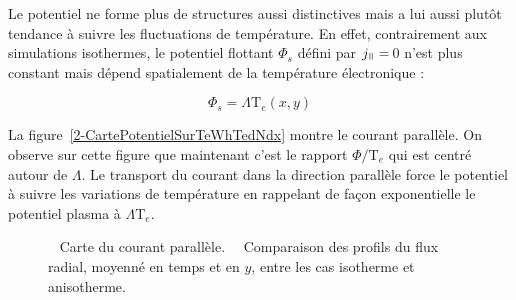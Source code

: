 \begin{refsection}
Le potentiel ne forme plus de structures aussi
distinctives mais a lui aussi
plutôt tendance à suivre les fluctuations de température. En effet,
contrairement aux simulations isothermes, le potentiel flottant $\Phi_s$ défini
par $j_\para=\,$0 n'est plus constant mais dépend spatialement de la
température électronique :

\begin{equation}
	\Phi_{s}=\Lambda\text{T}_e(x,y)
\end{equation}

La figure~\ref{2-CartePotentielSurTeWhTedNdx} montre le courant
parallèle. On observe sur cette figure
que maintenant c'est le rapport $\Phi/\text{T}_e$ qui est centré autour de
$\Lambda$. Le transport du courant dans la direction parallèle
force le potentiel à suivre les variations de température en rappelant de
façon exponentielle le potentiel plasma à $\Lambda\text{T}_e$. 

\begin{figure}[!htbp]
\centering
    \caption{~ Carte du courant parallèle.
    ~~Comparaison des profils du flux radial, moyenné en temps et en $y$, entre les cas
    isotherme et anisotherme.}
\end{figure}


\end{refsection}
